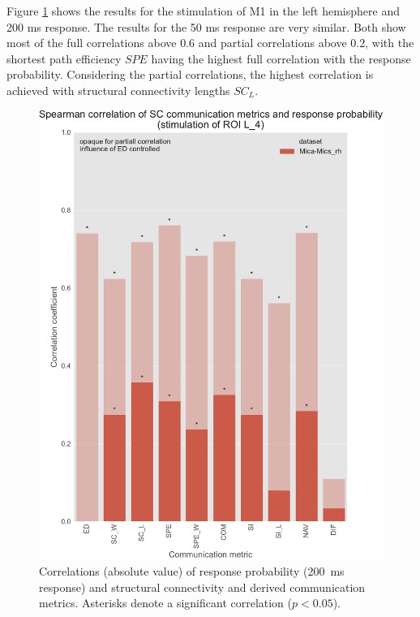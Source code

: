 Figure \ref{fig:ftract_mica_long_probabilities_L4} shows the results for the stimulation of M1 in the left hemisphere and 200 ms response. The results for the 50 ms response are very similar. Both show most of the full correlations above $0.6$ and partial correlations above $0.2$, with the shortest path efficiency $SPE$ having the highest full correlation with the response probability. Considering the partial correlations, the highest correlation is achieved with structural connectivity lengths $SC_L$.

\begin{figure}
    \centering
    \includegraphics[width=\textwidth]{images/nootebook_generated/ftract_results_per_roi/long/MNI-HCP-MMP1/ED0/0.25/Spearman_correlation_of_SC_communication_metrics_and_response_probability_(stimulation_of_ROI_L_4).pdf}
    \caption[F-TRACT probability correlations - Mica-Mics\_rh L\_4]{Correlations (absolute value) of response probability (200~ms response) and structural connectivity and derived communication metrics. Asterisks denote a significant correlation ($p<0.05$).}
    \label{fig:ftract_mica_long_probabilities_L4}
\end{figure}

